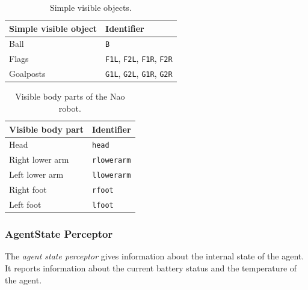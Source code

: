 \begin{table}
\centering
\begin{tabular}[htbp]{|l|l|}
  \hline
  {\bf Simple visible object} & {\bf Identifier} \\
  \hline\hline
  Ball & \texttt{B}\\ \hline
  Flags & \texttt{F1L}, \texttt{F2L}, \texttt{F1R}, \texttt{F2R} \\ \hline
  Goalposts & \texttt{G1L}, \texttt{G2L}, \texttt{G1R}, \texttt{G2R} \\
  \hline
\end{tabular}
\caption{Simple visible objects.}
\label{table:visible_objects}
\end{table}%

\begin{table}
\centering
\begin{tabular}[htbp]{|l|l|}
  \hline
  {\bf Visible body part} & {\bf Identifier} \\
  \hline\hline
  Head & \texttt{head} \\ \hline
  Right lower arm & \texttt{rlowerarm} \\ \hline
  Left lower arm & \texttt{llowerarm} \\ \hline
  Right foot & \texttt{rfoot} \\ \hline
  Left foot & \texttt{lfoot} \\
  \hline
\end{tabular}
\caption{Visible body parts of the Nao robot.}
\label{table:visible_bodyparts}
\end{table}%






\subsubsection{AgentState Perceptor}
\label{sec:agentstateperceptor}
The \emph{agent state perceptor} gives information about the internal state of
the agent. It reports information about the current battery status and
the temperature of the agent.

